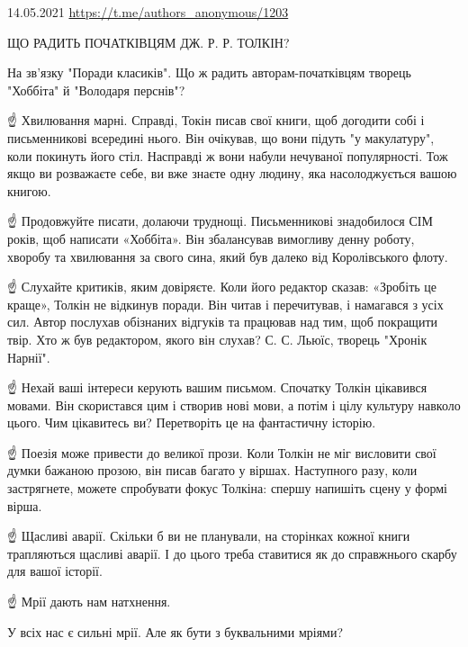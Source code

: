  
 
 
 
 

14.05.2021
\url{https://t.me/authors_anonymous/1203} 

ЩО РАДИТЬ ПОЧАТКІВЦЯМ ДЖ. Р. Р. ТОЛКІН?

На зв'язку "Поради класиків". 
Що ж радить авторам-початківцям творець "Хоббіта" й "Володаря перснів"?

☝️ Хвилювання марні.
Справді, Токін писав свої книги, щоб догодити собі і письменникові всередині нього. Він очікував, що вони підуть "у макулатуру", коли покинуть його стіл. Насправді ж вони набули нечуваної популярності. Тож якщо ви розважаєте себе, ви вже знаєте одну людину, яка насолоджується вашою книгою.

☝️ Продовжуйте писати, долаючи труднощі.
Письменникові знадобилося СІМ років, щоб написати «Хоббіта». Він збалансував вимогливу денну роботу, хворобу та хвилювання за свого сина, який був далеко від Королівського флоту. 

☝️ Слухайте критиків, яким довіряєте.
Коли його редактор сказав: «Зробіть це краще», Толкін не відкинув поради. Він читав і перечитував, і намагався з усіх сил.
Автор послухав обізнаних відгуків та працював над тим, щоб покращити твір. Хто ж був редактором, якого він слухав? С. С. Льюїс, творець "Хронік Нарнії".

☝️ Нехай ваші інтереси керують вашим письмом.
Спочатку Толкін цікавився мовами. Він скористався цим і створив нові мови, а потім і цілу культуру навколо цього. Чим цікавитесь ви? Перетворіть це на фантастичну історію.

☝️ Поезія може привести до великої прози.
Коли Толкін не міг висловити свої думки бажаною прозою, він писав багато у віршах. Наступного разу, коли застрягнете, можете спробувати фокус Толкіна: спершу напишіть сцену у формі вірша.

☝️ Щасливі аварії.
Скільки б ви не планували, на сторінках кожної книги трапляються щасливі аварії. І до цього треба ставитися як до справжнього скарбу для вашої історії.

☝️ Мрії дають нам натхнення.

У всіх нас є сильні мрії. Але як бути з буквальними мріями?

